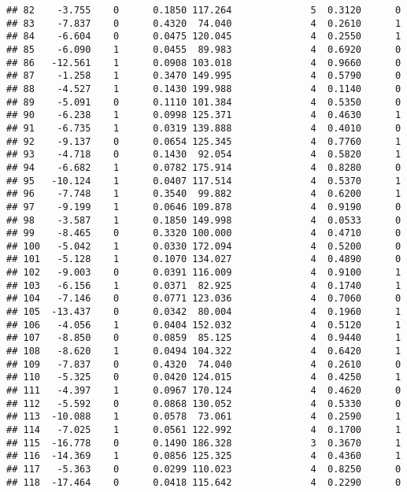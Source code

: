 \documentclass[
]{article}
\begin{document}
\begin{verbatim}
## 82    -3.755    0      0.1850 117.264              5  0.3120      0
## 83    -7.837    0      0.4320  74.040              4  0.2610      1
## 84    -6.604    0      0.0475 120.045              4  0.2550      1
## 85    -6.090    1      0.0455  89.983              4  0.6920      0
## 86   -12.561    1      0.0908 103.018              4  0.9660      0
## 87    -1.258    1      0.3470 149.995              4  0.5790      0
## 88    -4.527    1      0.1430 199.988              4  0.1140      0
## 89    -5.091    0      0.1110 101.384              4  0.5350      0
## 90    -6.238    1      0.0998 125.371              4  0.4630      1
## 91    -6.735    1      0.0319 139.888              4  0.4010      0
## 92    -9.137    0      0.0654 125.345              4  0.7760      1
## 93    -4.718    0      0.1430  92.054              4  0.5820      1
## 94    -6.682    1      0.0782 175.914              4  0.8280      0
## 95   -10.124    1      0.0407 117.514              4  0.5370      1
## 96    -7.748    1      0.3540  99.882              4  0.6200      1
## 97    -9.199    1      0.0646 109.878              4  0.9190      0
## 98    -3.587    1      0.1850 149.998              4  0.0533      0
## 99    -8.465    0      0.3320 100.000              4  0.4710      0
## 100   -5.042    1      0.0330 172.094              4  0.5200      0
## 101   -5.128    1      0.1070 134.027              4  0.4890      0
## 102   -9.003    0      0.0391 116.009              4  0.9100      1
## 103   -6.156    1      0.0371  82.925              4  0.1740      1
## 104   -7.146    0      0.0771 123.036              4  0.7060      0
## 105  -13.437    0      0.0342  80.004              4  0.1960      1
## 106   -4.056    1      0.0404 152.032              4  0.5120      1
## 107   -8.850    0      0.0859  85.125              4  0.9440      1
## 108   -8.620    1      0.0494 104.322              4  0.6420      1
## 109   -7.837    0      0.4320  74.040              4  0.2610      0
## 110   -5.325    0      0.0420 124.015              4  0.4250      1
## 111   -4.397    1      0.0967 170.124              4  0.4620      0
## 112   -5.592    0      0.0868 130.052              4  0.5330      0
## 113  -10.088    1      0.0578  73.061              4  0.2590      1
## 114   -7.025    1      0.0561 122.992              4  0.1700      1
## 115  -16.778    0      0.1490 186.328              3  0.3670      1
## 116  -14.369    1      0.0856 125.325              4  0.4360      1
## 117   -5.363    0      0.0299 110.023              4  0.8250      0
## 118  -17.464    0      0.0418 115.642              4  0.2290      0

\end{verbatim}
\end{document}
